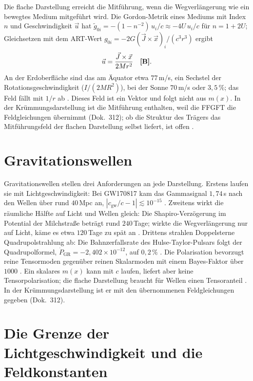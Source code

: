 Die flache Darstellung erreicht die Mitführung, wenn die Wegverlängerung wie ein bewegtes Medium
mitgeführt wird. Die Gordon-Metrik eines Mediums mit Index $n$ und Geschwindigkeit $\vec u$ hat
$\tilde g_{0i}=-(1-n^{-2})\,u_i/c\approx-4U\,u_i/c$ für $n=1+2U$; Gleichsetzen mit dem ART-Wert
$g_{0i}=-2G(\vec J\times\vec x)_i/(c^3r^3)$ ergibt
\begin{equation}
\vec u=\frac{\vec J\times\vec x}{2Mr^2}\quad\textbf{[B]}.
\end{equation}
An der Erdoberfläche sind das am Äquator etwa $77$\,m/s, ein Sechstel der Rotationsgeschwindigkeit
($I/(2MR^2)$), bei der Sonne $70$\,m/s oder $3{,}5\,\%$; das Feld fällt mit $1/r$ ab \KM. Dieses
Feld ist ein Vektor und folgt nicht aus $m(x)$. In der Krümmungsdarstellung ist die Mitführung
enthalten, weil die FFGFT die Feldgleichungen übernimmt (Dok.~312); ob die Struktur des Trägers das
Mitführungsfeld der flachen Darstellung selbst liefert, ist offen \SM.

\section{Gravitationswellen}

Gravitationswellen stellen drei Anforderungen an jede Darstellung. Erstens laufen sie mit
Lichtgeschwindigkeit: Bei GW170817 kam das Gammasignal $1{,}74$\,s nach den Wellen über rund
$40$\,Mpc an, $|c_{\text{gw}}/c-1|\lesssim10^{-15}$ \KM. Zweitens wirkt die räumliche Hälfte auf Licht
und Wellen gleich: Die Shapiro-Verzögerung im Potential der Milchstraße beträgt rund $240$\,Tage;
wirkte die Wegverlängerung nur auf Licht, käme es etwa $120$\,Tage zu spät an \KM. Drittens
strahlen Doppelsterne Quadrupolstrahlung ab: Die Bahnzerfallsrate des Hulse-Taylor-Pulsars folgt der
Quadrupolformel, $\dot P_{\text{GR}}=-2{,}402\times10^{-12}$, auf $0{,}2\,\%$ \KM. Die Polarisation
bevorzugt reine Tensormoden gegenüber reinen Skalarmoden mit einem Bayes-Faktor über $1000$ \QM.
Ein skalares $m(x)$ kann mit $c$ laufen, liefert aber keine Tensorpolarisation; die flache
Darstellung braucht für Wellen einen Tensoranteil \SM. In der Krümmungsdarstellung ist er mit den
übernommenen Feldgleichungen gegeben (Dok.~312).

\section{Die Grenze der Lichtgeschwindigkeit und die Feldkonstanten}


